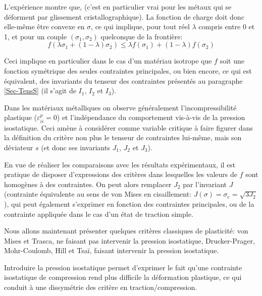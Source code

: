 L'expérience montre que,  (c'est en particulier vrai pour les métaux qui se déforment par glissement cristallographique). 
La fonction de charge doit donc elle-même être convexe en $\sigma$, ce qui implique, pour tout 
réel $\lambda$ compris entre 0 et 1, et pour un couple $(\sigma_1, \sigma_2)$ quelconque de la frontière:
\begin{equation} f (\lambda\sigma_1 + (1-\lambda)\sigma_2) \le \lambda f(\sigma_1) + (1-\lambda) f(\sigma_2) \end{equation}

Ceci implique en particulier dans le cas d'un matériau isotrope que $f$ soit une fonction symétrique des 
seules contraintes principales, ou bien encore, ce qui est équivalent, des invariants du tenseur des contraintes
présentés au paragraphe \ref{Sec-TensS} (il s'agit de $I_1$, $I_2$ et $I_3$).

\medskip
Dans les matériaux métalliques on observe généralement l'incompressibilité plastique ($\varepsilon^p_{ii} = 0$) 
et l'indépendance du comportement vis-à-vis de la pression isostatique. Ceci amène à considérer 
comme variable critique à faire figurer dans la définition du critère non plus le tenseur de contraintes lui-même, 
mais son déviateur $s$ (et donc ses invariants $J_1$, $J_2$ et $J_3$).

En vue de réaliser les comparaisons avec les résultats expérimentaux, il est pratique de disposer d'expressions 
des critères dans lesquelles les valeurs de $f$ sont homogènes à des contraintes.
On peut alors remplacer $J_2$ par l'invariant $J$ (contrainte équivalente au sens de von Mises en cisaillement: 
$J(\sigma)=\sigma_e= \sqrt{3J_2}$), qui peut également s'exprimer en fonction des contraintes principales, 
ou de la contrainte appliquée dans le cas d'un état de traction simple.

\medskip
Nous allons maintenant présenter quelques critères classiques de plasticité: von Mises et Trasca, ne faisant 
pas intervenir la pression isostatique, Drucker-Prager, Mohr-Coulomb, Hill et Tsaï, faisant intervenir
la pression isostatique.

Introduire la pression isostatique permet d'exprimer le fait qu'une contrainte isostatique de compression 
rend plus difficile la déformation plastique, ce qui conduit à une dissymétrie des critère en 
traction/compression.

